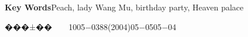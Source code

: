 \documentclass[a4paper,11pt,onecolumn,twoside]{article}
\begin{document}
\begin{CJK*}{GBK}{song}
\begin{center}
{{{\textbf{Key Words}\quad Peach, lady Wang Mu, birthday party, Heaven palace}}
}
\end{center}
\begin{minipage}[c]{10cm}
\vspace{-35.5cm}
���±��~~~~1005$-$0388(2004)05$-$0505$-$04
\end{minipage}
\setlength{\oddsidemargin}{-.5cm}  %
\setlength{\evensidemargin}{\oddsidemargin}
\setlength{\textwidth}{17.00cm}
\begin{multicols}{2}

\end{multicols}
\end{CJK*}
\end{document}
